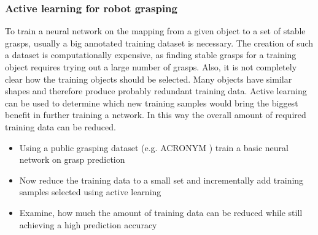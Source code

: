 \documentclass[a4paper]{article}
\begin{document}
\subsubsection{Active learning for robot grasping}

To train a neural network on the mapping from a given object to a set of stable grasps, usually a big annotated training dataset is necessary.
The creation of such a dataset is computationally expensive, as finding stable grasps for a training object requires trying out a large number of grasps.
Also, it is not completely clear how the training objects should be selected.
Many objects have similar shapes and therefore produce probably redundant training data.
Active learning can be used to determine which new training samples would bring the biggest benefit in further training a network.
In this way the overall amount of required training data can be reduced.

\begin{itemize}
  \item Using a public grasping dataset (e.g. ACRONYM \cite{acronym2020}) train a basic neural network on grasp prediction \cite{sundermeyer2021contact}
  \item Now reduce the training data to a small set and incrementally add training samples selected using active learning \cite{gal2017deep}
  \item Examine, how much the amount of training data can be reduced while still achieving a high prediction accuracy
\end{itemize}




\end{document}
